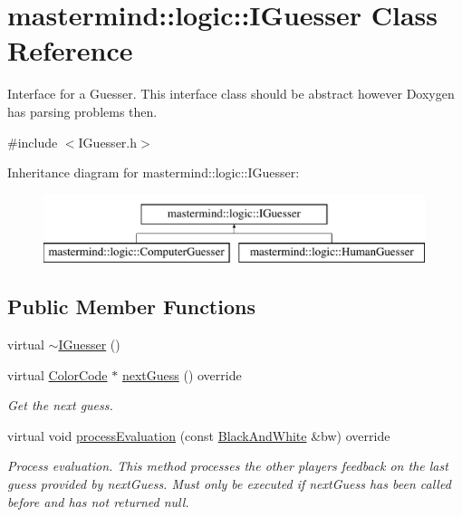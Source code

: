 \hypertarget{classmastermind_1_1logic_1_1_i_guesser}{}\section{mastermind\+:\+:logic\+:\+:I\+Guesser Class Reference}
\label{classmastermind_1_1logic_1_1_i_guesser}


Interface for a Guesser. This interface class should be abstract however Doxygen has parsing problems then.  




{\ttfamily \#include $<$I\+Guesser.\+h$>$}

Inheritance diagram for mastermind\+:\+:logic\+:\+:I\+Guesser\+:\begin{figure}[H]
\begin{center}
\leavevmode
\includegraphics[height=2.000000cm]{classmastermind_1_1logic_1_1_i_guesser}
\end{center}
\end{figure}
\subsection*{Public Member Functions}
\begin{DoxyCompactItemize}
\item 
virtual \hyperlink{classmastermind_1_1logic_1_1_i_guesser_a43ad2f926001589dd454925b839ab106}{$\sim$\+I\+Guesser} ()
\item 
virtual \hyperlink{classmastermind_1_1logic_1_1_color_code}{Color\+Code} $\ast$ \hyperlink{classmastermind_1_1logic_1_1_i_guesser_a285f709f2076098acb5bc7c49a1435c7}{next\+Guess} () override
\begin{DoxyCompactList}\small\item\em Get the next guess. \end{DoxyCompactList}\item 
virtual void \hyperlink{classmastermind_1_1logic_1_1_i_guesser_a83a8fbd8aed3c4fa8c7a023fd7ebd6e7}{process\+Evaluation} (const \hyperlink{classmastermind_1_1logic_1_1_black_and_white}{Black\+And\+White} \&bw) override
\begin{DoxyCompactList}\small\item\em Process evaluation. This method processes the other player\textquotesingle{}s feedback on the last guess provided by {\ttfamily next\+Guess}. Must only be executed if {\ttfamily next\+Guess} has been called before and has not returned {\ttfamily null}. \end{DoxyCompactList}\end{DoxyCompactItemize}


